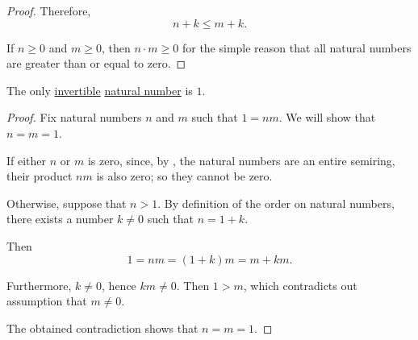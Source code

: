\begin{proof}
  Therefore,
  \begin{equation*}
    n + k \leq m + k.
  \end{equation*}

   If \( n \geq 0 \) and \( m \geq 0 \), then \( n \cdot m \geq 0 \) for the simple reason that all natural numbers are greater than or equal to zero.
\end{proof}

\begin{proposition}\label{thm:natural_number_multiplicative_invertibility}
  The only \hyperref[def:divisibility/invertible]{invertible} \hyperref[def:natural_numbers]{natural number} is \( 1 \).
\end{proposition}
\begin{proof}
  Fix natural numbers \( n \) and \( m \) such that \( 1 = nm \). We will show that \( n = m = 1 \).

  If either \( n \) or \( m \) is zero, since, by , the natural numbers are an entire semiring, their product \( nm \) is also zero; so they cannot be zero.

  Otherwise, suppose that \( n > 1 \). By definition of the order on natural numbers, there exists a number \( k \neq 0 \) such that \( n = 1 + k \).

  Then
  \begin{equation*}
    1 = nm = (1 + k)m = m + km.
  \end{equation*}

  Furthermore, \( k \neq 0 \), hence \( km \neq 0 \). Then \( 1 > m \), which contradicts out assumption that \( m \neq 0 \).

  The obtained contradiction shows that \( n = m = 1 \).
\end{proof}

